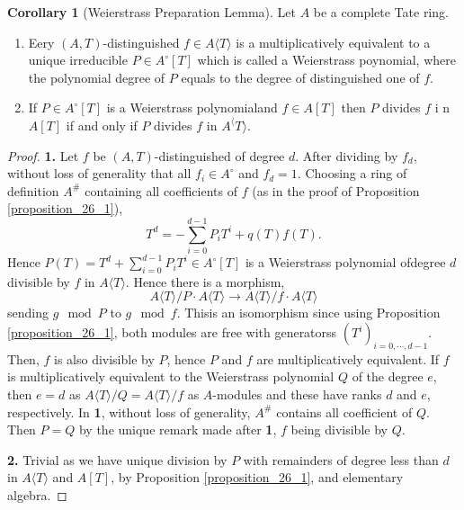 \documentclass[10pt]{article}
\numberwithin{equation}{section}
\theoremstyle{definition}
\newtheorem{corollary}{Corollary} [subsection]
\begin{document}
\begin{corollary}[Weierstrass Preparation Lemma]
    Let $A$ be a complete Tate ring.
    \begin{enumerate}[1. ]
        \item Eery $(A,T)$-distinguished $f\in A\langle T\rangle$ is a multiplicatively equivalent to a unique irreducible $P\in A^\circ[T]$ which is called a Weierstrass poynomial, where the polynomial degree of $P$ equals to the degree of distinguished one of $f$.
        \item If $P\in A^\circ[T]$ is a Weierstrass polynomialand $f\in A[T]$ then $P$ divides $f$ i n$A[T]$ if and only if $P$ divides $f$ in $A^\langle T\rangle$.
    \end{enumerate}
\end{corollary}
\begin{proof}
    \textbf{1.} Let $f$ be $(A,T)$-distinguished of degree $d$. After dividing by $f_d$, without loss of generality that all $f_i\in A^\circ$ and $f_d=1$. 
    Choosing a ring of definition $A^\#$ containing all coefficients of $f$ (as in the proof of Proposition \ref{proposition_26_1}), 
    \begin{equation*}
        T^d = -\sum_{i=0}^{d-1}P_iT^i + q(T)f(T).
    \end{equation*}
    Hence $P(T) = T^d+\sum_{i=0}^{d-1}P_iT^i\in A^\circ[T]$ is a Weierstrass polynomial ofdegree $d$ divisible by $f$ in $A\langle T\rangle$. Hence there is a morphism,
    \begin{equation*}
        A\langle T\rangle/P\cdot A\langle T\rangle\to A\langle T\rangle/f\cdot A\langle T\rangle
    \end{equation*}
    sending $g\mod{P}$ to $g\mod{f}$. Thisis an isomorphism since using Proposition \ref{proposition_26_1}, both modules are free with generatorss $(T^i)_{i=0,\cdots,d-1}$. 
    Then, $f$ is also divisible by $P$, hence $P$ and $f$ are multiplicatively equivalent. If $f$ is multiplicatively equivalent to the Weierstrass polynomial $Q$ of the degree $e$, then $e=d$ as $A\langle T\rangle/Q=A\langle T\rangle /f$ as $A$-modules and these have ranks $d$ and $e$, respectively. 
    In \textbf{1}, without loss of generality, $A^\#$ contains all coefficient of $Q$. Then $P=Q$ by the unique remark made after \textbf{1}, $f$ being divisible by $Q$.
    \par\textbf{2.} Trivial as we have unique division by $P$ with remainders of degree less than $d$ in $A\langle T\rangle$ and $A[T]$, by Proposition \ref{proposition_26_1}, and elementary algebra.
\end{proof}
\end{document}
